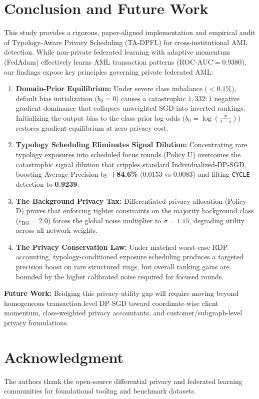 \documentclass[conference]{IEEEtran}
\begin{document}
\section{Conclusion and Future Work}
This study provides a rigorous, paper-aligned implementation and empirical audit of Typology-Aware Privacy Scheduling (TA-DPFL) for cross-institutional AML detection. While non-private federated learning with adaptive momentum (FedAdam) effectively learns AML transaction patterns ($\text{ROC-AUC} = 0.9380$), our findings expose key principles governing private federated AML:
\begin{enumerate}
    \item \textbf{Domain-Prior Equilibrium:} Under severe class imbalance ($< 0.1\%$), default bias initialization ($b_0 = 0$) causes a catastrophic $1,332:1$ negative gradient dominance that collapses unweighted SGD into inverted rankings. Initializing the output bias to the class-prior log-odds ($b_0 = \log(\frac{\pi}{1-\pi})$) restores gradient equilibrium at zero privacy cost.
    \item \textbf{Typology Scheduling Eliminates Signal Dilution:} Concentrating rare typology exposures into scheduled focus rounds (Policy U) overcomes the catastrophic signal dilution that cripples standard Individualized-DP-SGD, boosting Average Precision by \textbf{+84.6\%} ($0.0153$ vs $0.0083$) and lifting \texttt{CYCLE} detection to \textbf{0.9239}.
    \item \textbf{The Background Privacy Tax:} Differentiated privacy allocation (Policy D) proves that enforcing tighter constraints on the majority background class ($\varepsilon_{\text{BG}} = 2.0$) forces the global noise multiplier to $\sigma = 1.15$, degrading utility across all network weights.
    \item \textbf{The Privacy Conservation Law:} Under matched worst-case RDP accounting, typology-conditioned exposure scheduling produces a targeted precision boost on rare structured rings, but overall ranking gains are bounded by the higher calibrated noise required for focused rounds.
\end{enumerate}

\textbf{Future Work:} Bridging this privacy-utility gap will require moving beyond homogeneous transaction-level DP-SGD toward coordinate-wise client momentum, class-weighted privacy accountants, and customer/subgraph-level privacy formulations.

\section*{Acknowledgment}
The authors thank the open-source differential privacy and federated learning communities for foundational tooling and benchmark datasets.
\end{document}
